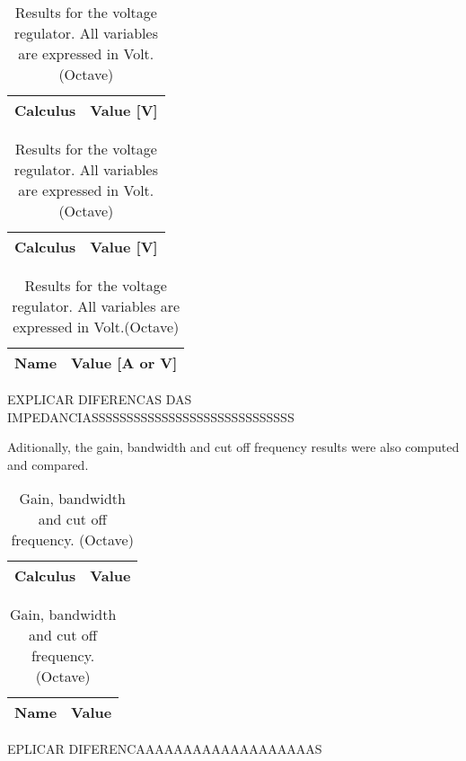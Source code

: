 \begin{table}[ht]
\parbox{.45\linewidth}{
  \centering
  \begin{tabular}{|l|r|}
    \hline    
    {\bf Calculus} & {\bf Value [V]} \\ \hline
    
  \end{tabular}
  \caption{Results for the voltage regulator. All variables are expressed in Volt. (Ngspice)}} 
\parbox{.45\linewidth}{
  \centering
  \begin{tabular}{|l|r|}
    \hline    
    {\bf Calculus} & {\bf Value [V]} \\ \hline
    
  \end{tabular}
  \caption{Results for the voltage regulator. All variables are expressed in Volt. (Ngspice)}} 
\parbox{.45\linewidth}{
  \centering
  \begin{tabular}{|l|r|}
    \hline    
    {\bf Name} & {\bf Value [A or V]} \\ \hline
    
  \end{tabular}
  \caption{Results for the voltage regulator. All variables are expressed in Volt.(Octave)}}
\end{table}
 
 EXPLICAR DIFERENCAS DAS IMPEDANCIASSSSSSSSSSSSSSSSSSSSSSSSSSSSS
 
 Aditionally, the gain, bandwidth and cut off frequency results were also computed and compared.
 
 \begin{table}[ht]
\parbox{.45\linewidth}{
  \centering
  \begin{tabular}{|l|r|}
    \hline    
    {\bf Calculus} & {\bf Value} \\ \hline
    
  \end{tabular}
  \caption{Gain, bandwidth and cut off frequency. (Ngspice)}} 
\parbox{.45\linewidth}{
 \centering
  \begin{tabular}{|l|r|}
    \hline    
    {\bf Name} & {\bf Value} \\ \hline
    
  \end{tabular}
  \caption{Gain, bandwidth and cut off frequency. (Octave)}}
\end{table}
 
 
 EPLICAR DIFERENCAAAAAAAAAAAAAAAAAAAS
 






